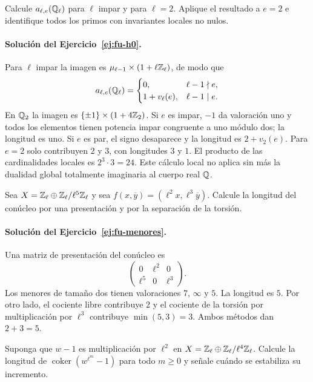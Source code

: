 \begin{ejercicio}\label{ej:fu-h0}
Calcule $a_{\ell,e}(\mathbb{Q}_\ell)$ para $\ell$ impar y para
$\ell=2$. Aplique el resultado a $e=2$ e identifique todos
los primos con invariantes locales no nulos.
\end{ejercicio}

\paragraph{Solución del Ejercicio~\ref{ej:fu-h0}.}
Para $\ell$ impar la imagen es
$\mu_{\ell-1}\times(1+\ell\mathbb{Z}_\ell)$, de modo que
\[
 a_{\ell,e}(\mathbb{Q}_\ell)=
 \begin{cases}
  0,&\ell-1\nmid e,\\
  1+v_\ell(e),&\ell-1\mid e.
 \end{cases}
\]
En $\mathbb{Q}_2$ la imagen es $\{\pm1\}\times(1+4\mathbb{Z}_2)$.
Si $e$ es impar, $-1$ da valoración uno y todos los elementos
tienen potencia impar congruente a uno módulo dos; la longitud
es uno. Si $e$ es par, el signo desaparece y la longitud es
$2+v_2(e)$. Para $e=2$ solo contribuyen $2$ y $3$, con
longitudes $3$ y $1$. El producto de las cardinalidades
locales es $2^3\cdot3=24$.
Este cálculo local no aplica sin más la dualidad global
totalmente imaginaria al cuerpo real $\mathbb{Q}$.

\begin{ejercicio}\label{ej:fu-menores}
Sea $X=\mathbb{Z}_\ell\oplus\mathbb{Z}_\ell/\ell^5\mathbb{Z}_\ell$ y sea
$f(x,\overline y)=(\ell^2x,\ell^3\overline y)$.
Calcule la longitud del conúcleo por una presentación y
por la separación de la torsión.
\end{ejercicio}

\paragraph{Solución del Ejercicio~\ref{ej:fu-menores}.}
Una matriz de presentación del conúcleo es
\[
 \begin{pmatrix}0&\ell^2&0\\\ell^5&0&\ell^3\end{pmatrix}.
\]
Los menores de tamaño dos tienen valoraciones $7$, $\infty$
y $5$. La longitud es $5$. Por otro lado, el cociente libre
contribuye $2$ y el cociente de la torsión por multiplicación
por $\ell^3$ contribuye $\min(5,3)=3$.
Ambos métodos dan $2+3=5$.

\clearpage
\begin{ejercicio}\label{ej:fu-crecimiento}
Suponga que $w-1$ es multiplicación por $\ell^2$ en
$X=\mathbb{Z}_\ell\oplus\mathbb{Z}_\ell/\ell^4\mathbb{Z}_\ell$.
Calcule la longitud de $\operatorname{coker}(w^{\ell^m}-1)$
para todo $m\ge0$ y señale cuándo se estabiliza su incremento.
\end{ejercicio}

